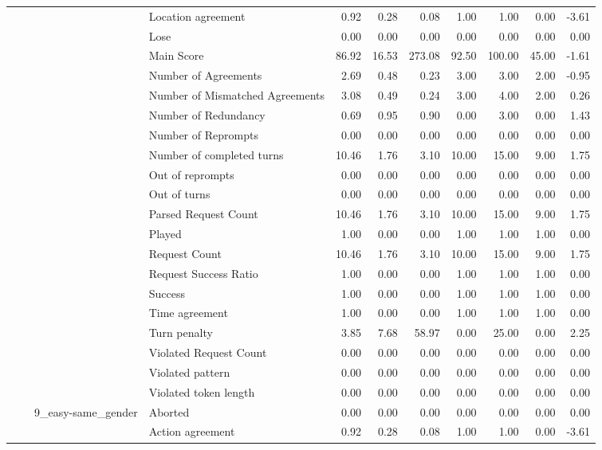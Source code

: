 \begin{tabular}{llllrrrrrrr}
 &  &  & Location agreement & 0.92 & 0.28 & 0.08 & 1.00 & 1.00 & 0.00 & -3.61 \\
 &  &  & Lose & 0.00 & 0.00 & 0.00 & 0.00 & 0.00 & 0.00 & 0.00 \\
 &  &  & Main Score & 86.92 & 16.53 & 273.08 & 92.50 & 100.00 & 45.00 & -1.61 \\
 &  &  & Number of Agreements & 2.69 & 0.48 & 0.23 & 3.00 & 3.00 & 2.00 & -0.95 \\
 &  &  & Number of Mismatched Agreements & 3.08 & 0.49 & 0.24 & 3.00 & 4.00 & 2.00 & 0.26 \\
 &  &  & Number of Redundancy & 0.69 & 0.95 & 0.90 & 0.00 & 3.00 & 0.00 & 1.43 \\
 &  &  & Number of Reprompts & 0.00 & 0.00 & 0.00 & 0.00 & 0.00 & 0.00 & 0.00 \\
 &  &  & Number of completed turns & 10.46 & 1.76 & 3.10 & 10.00 & 15.00 & 9.00 & 1.75 \\
 &  &  & Out of reprompts & 0.00 & 0.00 & 0.00 & 0.00 & 0.00 & 0.00 & 0.00 \\
 &  &  & Out of turns & 0.00 & 0.00 & 0.00 & 0.00 & 0.00 & 0.00 & 0.00 \\
 &  &  & Parsed Request Count & 10.46 & 1.76 & 3.10 & 10.00 & 15.00 & 9.00 & 1.75 \\
 &  &  & Played & 1.00 & 0.00 & 0.00 & 1.00 & 1.00 & 1.00 & 0.00 \\
 &  &  & Request Count & 10.46 & 1.76 & 3.10 & 10.00 & 15.00 & 9.00 & 1.75 \\
 &  &  & Request Success Ratio & 1.00 & 0.00 & 0.00 & 1.00 & 1.00 & 1.00 & 0.00 \\
 &  &  & Success & 1.00 & 0.00 & 0.00 & 1.00 & 1.00 & 1.00 & 0.00 \\
 &  &  & Time agreement & 1.00 & 0.00 & 0.00 & 1.00 & 1.00 & 1.00 & 0.00 \\
 &  &  & Turn penalty & 3.85 & 7.68 & 58.97 & 0.00 & 25.00 & 0.00 & 2.25 \\
 &  &  & Violated Request Count & 0.00 & 0.00 & 0.00 & 0.00 & 0.00 & 0.00 & 0.00 \\
 &  &  & Violated pattern & 0.00 & 0.00 & 0.00 & 0.00 & 0.00 & 0.00 & 0.00 \\
 &  &  & Violated token length & 0.00 & 0.00 & 0.00 & 0.00 & 0.00 & 0.00 & 0.00 \\
\cline{3-11}
 &  & \multirow[t]{27}{*}{9_easy-same_gender} & Aborted & 0.00 & 0.00 & 0.00 & 0.00 & 0.00 & 0.00 & 0.00 \\
 &  &  & Action agreement & 0.92 & 0.28 & 0.08 & 1.00 & 1.00 & 0.00 & -3.61 \\

\end{tabular}
